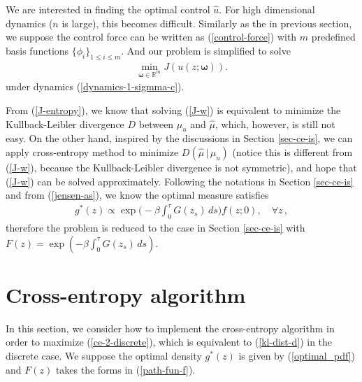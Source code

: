 \documentclass[final]{siamltex}
\begin{document}
We are interested in finding the optimal control $\hat{u}$. For high
dimensional dynamics ($n$ is large), this becomes difficult.  
Similarly as the in previous section, we suppose the control force can be written
as (\ref{control-force}) with $m$ predefined basis functions $\{\phi_i\}_{1\le
i \le m}$. And our problem is simplified to solve
\begin{align}
  \min_{\bm{\omega} \in \mathbb{R}^m} J(u(z;\bm{\omega})).
  \label{J-w}
\end{align}
under dynamics (\ref{dynamics-1-sigmma-c}).

From (\ref{J-entropy}), we know that solving (\ref{J-w})
is equivalent to minimize the Kullback-Leibler divergence $D$ between
$\mu_u$ and $\hat{\mu}$, which, however, is still not easy. On the other hand, inspired by 
the discussions in Section \ref{sec-ce-is}, we can apply cross-entropy method 
to minimize $D(\hat{\mu} \,|\, \mu_u)$ (notice this is different from
(\ref{J-w}), because the Kullback-Leibler divergence is not symmetric), and
hope that (\ref{J-w}) can be solved approximately. Following
the notations in Section \ref{sec-ce-is} and from (\ref{jensen-as}), we know the optimal measure
satisfies
\begin{align}
  g^*(z) \propto \exp\Big(-\beta\int_0^\tau G(z_s) \,ds\Big) f(z ; 0),
  \quad \forall z\,,
\end{align}
therefore the problem is reduced to the case in Section \ref{sec-ce-is} with $F(z) = \exp(-\beta\int_0^\tau G(z_s) \,ds)$.
\section{Cross-entropy algorithm}
\label{sec-ce-algo}
In this section, we consider how to implement the cross-entropy algorithm in
order to maximize (\ref{ce-2-discrete}), which is equivalent to (\ref{kl-dist-d}) in the discrete case. 
We suppose the optimal density $g^*(z)$ is given by (\ref{optimal_pdf}) and
$F(z)$ takes the forms in (\ref{path-fun-f}).
\end{document}
